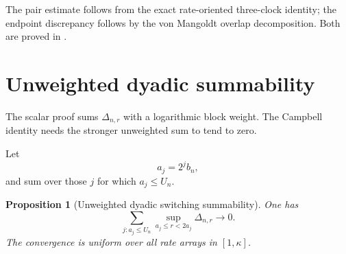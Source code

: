 \documentclass[11pt]{article}
\newtheorem{proposition}[theorem]{Proposition}
\theoremstyle{definition}
\theoremstyle{remark}
\begin{document}
The pair estimate follows from the exact rate-oriented three-clock identity;
the endpoint discrepancy follows by the von Mangoldt overlap decomposition.
Both are proved in \cite{LongOrder2026}.

\section{Unweighted dyadic summability}

The scalar proof sums $\Delta_{n,r}$ with a logarithmic block weight.  The
Campbell identity needs the stronger unweighted sum to tend to zero.

Let
\begin{equation}\label{eq:dyadic-aj}
 a_j=2^jb_n,
\end{equation}
and sum over those $j$ for which $a_j\le U_n$.

\begin{proposition}[Unweighted dyadic switching summability]
\label{prop:unweighted}
One has
\begin{equation}\label{eq:unweighted}
 \boxed{
 \sum_{j:a_j\le U_n}
 \sup_{a_j\le r<2a_j}\Delta_{n,r}
 \longrightarrow0.}
\end{equation}
The convergence is uniform over all rate arrays in $[1,\kappa]$.
\end{proposition}
\end{document}
